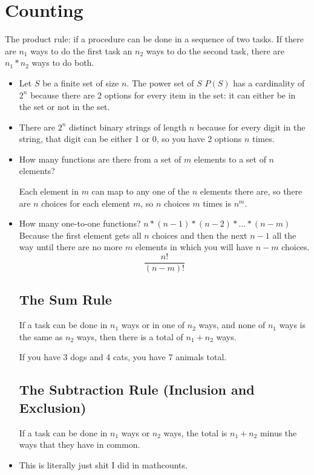 \documentclass{report}
\begin{document}
\chapter{Counting}
The product rule: if a procedure can be done in a sequence of two tasks. If there are $n_1$ ways to do the first task an $n_2$ ways to do the second task, there are $n_1*n_2$ ways to do both.
\begin{itemize}
\item
Let $S$ be a finite set of size $n$. The power set of $S$ $P(S)$ has a cardinality of $2^n$ because there are 2 options for every item in the set: it can either be in the set or not in the set.
\item
There are $2^n$ distinct binary strings of length $n$ because for every digit in the string, that digit can be either 1 or 0, so you have 2 options $n$ times.
\item
How many functions are there from a set of $m$ elements to a set of $n$ elements?

Each element in $m$ can map to any one of the $n$ elements there are, so there are $n$ choices for each element $m$, so $n$ choices $m$ times is $n^m$.

\item
How many one-to-one functions?
$n*(n-1)*(n-2)*\ldots*(n-m)$ Because the first element gets all $n$ choices and then the next $n-1$ all the way until there are no more $m$ elements in which you will have $n-m$ choices.
\[
\frac{n!}{(n-m)!}
\]


\section{The Sum Rule}
If a task can be done in $n_1$ ways or in one of $n_2$ ways, and none of $n_1$ ways is the same as $n_2$ ways, then there is a total of $n_1+n_2$ ways.

If you have 3 dogs and 4 cats, you have 7 animals total.

\section{The Subtraction Rule (Inclusion and Exclusion)}
If a task can be done in $n_1$ ways or $n_2$ ways, the total is $n_1 + n_2$ minus the ways that they have in common.

\item
This is literally just shit I did in mathcounts.
\end{itemize}
\end{document}

